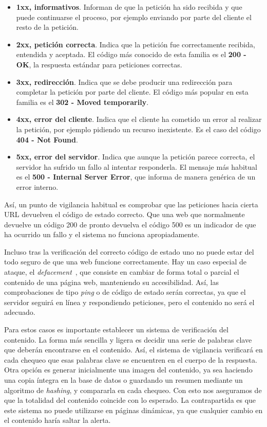 \begin{itemize}
\item \textbf{1xx, informativos}. Informan de que la petición ha sido recibida y
  que puede continuarse el proceso, por ejemplo enviando por parte del cliente
  el resto de la petición.
\item \textbf{2xx, petición correcta}. Indica que la petición fue correctamente
  recibida, entendida y aceptada. El código más conocido de esta familia es el
  \textbf{200 - OK}, la respuesta estándar para peticiones correctas.
\item \textbf{3xx, redirección}. Indica que se debe producir una redirección
  para completar la petición por parte del cliente. El código más popular en
  esta familia es el \textbf{302 - Moved temporarily}.
\item \textbf{4xx, error del cliente}. Indica que el cliente ha cometido un
  error al realizar la petición, por ejemplo pidiendo un recurso inexistente. Es
  el caso del código \textbf{404 - Not Found}.
\item \textbf{5xx, error del servidor}. Indica que aunque la petición parece
  correcta, el servidor ha sufrido un fallo al intentar responderla. El mensaje
  más habitual es el \textbf{500 - Internal Server Error}, que informa de manera
  genérica de un error interno.
\end{itemize}

Así, un punto de vigilancia habitual es comprobar que las peticiones hacia
cierta \ac{URL} devuelven el código de estado correcto. Que una web que
normalmente devuelve un código 200 de pronto devuelva el código 500 es un
indicador de que ha ocurrido un fallo y el sistema no funciona apropiadamente.

Incluso tras la verificación del correcto código de estado uno no puede estar
del todo seguro de que una web funcione correctamente. Hay un caso especial de
ataque, el \textit{defacement}~\cite{wiki:defacement}, que consiste en cambiar
de forma total o parcial el contenido de una página web, manteniendo su
accesibilidad. Así, las comprobaciones de tipo \textit{ping} o de código de
estado serán correctas, ya que el servidor seguirá en línea y respondiendo
peticiones, pero el contenido no será el adecuado.

Para estos casos es importante establecer un sistema de verificación del
contenido. La forma más sencilla y ligera es decidir una serie de palabras clave
que deberán encontrarse en el contenido. Así, el sistema de vigilancia
verificará en cada chequeo que esas palabras clave se encuentren en el cuerpo de
la respuesta. Otra opción es generar inicialmente una imagen del contenido, ya
sea haciendo una copia íntegra en la base de datos o guardando un resumen
mediante un algoritmo de \textit{hashing}, y compararla en cada chequeo. Con
esto nos aseguramos de que la totalidad del contenido coincide con lo
esperado. La contrapartida es que este sistema no puede utilizarse en páginas
dinámicas, ya que cualquier cambio en el contenido haría saltar la alerta.

